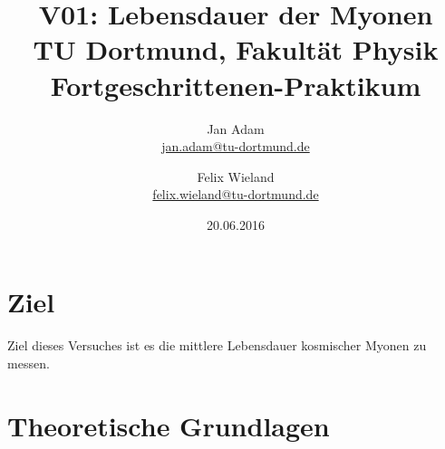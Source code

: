 



\title{V01: Lebensdauer der Myonen\\				%
	\large TU Dortmund, Fakultät Physik\\ 
	\normalsize Fortgeschrittenen-Praktikum}

\author{Jan Adam\\			%
	{\small \href{jan.adam@tu-dortmund.de}{jan.adam@tu-dortmund.de}}	%
	\and						%
	Felix Wieland\\					%
	{\small \href{felix.wieland@tu-dortmund.de}{felix.wieland@tu-dortmund.de}}		%
}
\date{20.06.2016}				%



	

\maketitle					%
\thispagestyle{empty} 				%


\tableofcontents
\newpage					%

\section{Ziel}
Ziel dieses Versuches ist es die mittlere Lebensdauer kosmischer Myonen zu messen.

\section{Theoretische Grundlagen}
